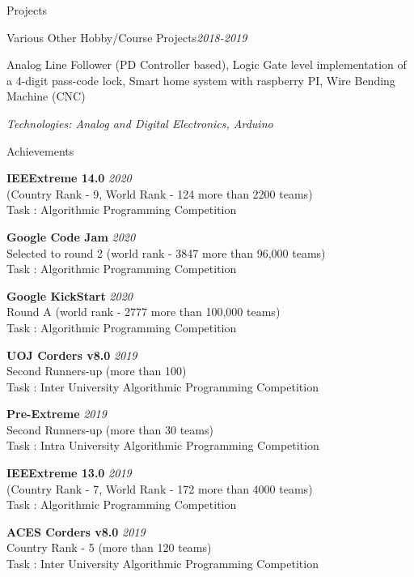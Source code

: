 \documentclass{resume} %
\begin{document}
\begin{rSection}{Projects}
\begin{rSubsection}{Various Other Hobby/Course Projects}{\em {2018-2019}}{}{}
\item Analog Line Follower (PD Controller based), Logic Gate level implementation of a 4-digit pass-code lock, Smart home system with raspberry PI, Wire Bending Machine (CNC)
\item \textit{Technologies: Analog and Digital Electronics, Arduino}
\end{rSubsection}


\begin{rSection}{Achievements}

{\bf IEEExtreme 14.0} \hfill {\em 2020}
\\ (Country Rank - 9, World Rank - 124 more than 2200 teams)
\\Task : Algorithmic Programming Competition


{\bf Google Code Jam} \hfill {\em 2020}
\\Selected to round 2 (world rank - 3847 more than 96,000 teams)
\\Task : Algorithmic Programming Competition

{\bf Google KickStart} \hfill {\em 2020}
\\Round A (world rank - 2777 more than 100,000 teams)
\\Task : Algorithmic Programming Competition

{\bf UOJ Corders v8.0 } \hfill {\em 2019}
\\Second Runners-up (more than 100)
\\Task : Inter University Algorithmic Programming Competition

{\bf Pre-Extreme } \hfill {\em 2019}
\\Second Runners-up (more than 30 teams)
\\Task : Intra University Algorithmic Programming Competition

{\bf IEEExtreme 13.0} \hfill {\em 2019}
\\ (Country Rank - 7, World Rank - 172 more than 4000 teams)
\\Task : Algorithmic Programming Competition

{\bf ACES Corders v8.0 } \hfill {\em 2019}
\\Country Rank - 5 (more than 120 teams)
\\Task : Inter University Algorithmic Programming Competition


\end{rSection}
\end{rSection}
\end{document}
